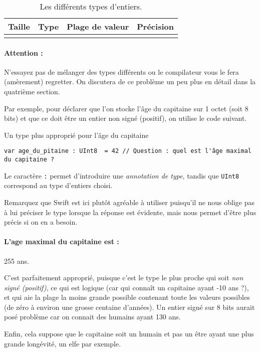 \begin{longtabu} to \linewidth {|X[3,l,m]|X[1.5,l,m]|X[6,r,m]|X[1,r,m]|}
\hline Taille & Type & Plage de valeur & Précision \\ \hline
\endhead

\caption{Les différents types d'entiers.}
\end{longtabu}

\paragraph{Attention :}
N'essayez pas de mélanger des types différents ou
le compilateur vous le fera (amèrement) regretter.
On discutera de ce problème un peu plus en détail dans la quatrième section.

Par exemple, pour déclarer que l'on stocke l'âge du capitaine sur 1 octet
(soit 8 bits) et que ce doit être un entier non signé (positif), on utilise le code suivant.

\begin{listing}[h]
\caption{Un type plus approprié pour l'âge du capitaine}
\begin{verbatim}
var age_du_pitaine : UInt8  = 42 // Question : quel est l'âge maximal du capitaine ?
\end{verbatim}
\end{listing}
Le caractère \verb":" permet d'introduire une \emph{annotation de type},
tandis que \verb"UInt8" correspond au type d'entiers choisi.

Remarquez que Swift est ici plutôt agréable à utiliser puisqu'il ne nous oblige pas à lui préciser le type lorsque la réponse est évidente, mais nous permet d'être plus précis si on en a besoin.
\paragraph{L'age maximal du capitaine est :}
255 ans.

C'est parfaitement approprié, puisque c'est le type le plus proche
qui soit \emph{non signé (positif)}, ce qui est logique (car qui connaît un capitaine ayant -10 ans ?), et qui aie la plage la moins grande possible contenant toute les valeurs possibles (de zéro à environ une grosse centaine d'années).
Un entier signé sur 8 bits aurait posé problème
car on connait des humains ayant 130 ans.

Enfin, cela suppose que le capitaine soit un humain
et pas un être ayant une plus grande longévité, un elfe par exemple.

